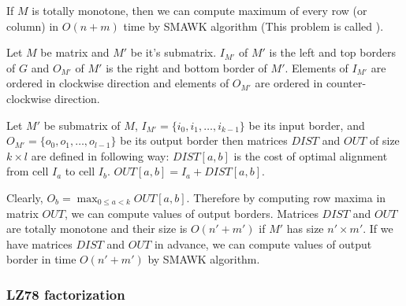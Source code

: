 If $M$ is totally monotone, then we can compute maximum of every row (or column)
in $O(n+m)$ time by SMAWK algorithm \cite{Aggarwal1987} (This problem is called
).

\begin{definition}\cite{Crochemore2002}
Let $M$ be matrix and $M'$ be it's
submatrix.  $I_{M'}$ of $M'$ is the left and top
borders of $G$ and  $O_{M'}$ of $M'$ is the right and
bottom border of $M'$. Elements of $I_{M'}$ are ordered in clockwise direction
and elements of $O_{M'}$ are ordered in counter-clockwise direction.
\end{definition}

\begin{definition}\cite{Crochemore2002}
Let $M'$ be submatrix of $M$, $I_{M'}=\{i_0,i_1,\dots,i_{k-1}\}$ be its input
border, and $O_{M'}=\{o_0,o_1,\dots,o_{l-1}\}$ be its output border then
matrices
$DIST$ and $OUT$ of size $k\times l$ are defined in following way:
$DIST[a,b]$ is the cost of optimal alignment from cell $I_a$ to cell $I_b$.
$OUT[a,b]=I_a+DIST[a,b]$.
\end{definition}

Clearly, $O_b=\max_{0\leq a < k}OUT[a,b]$. Therefore by computing row maxima in
matrix $OUT$, we can compute values of output borders. Matrices $DIST$ and $OUT$
are totally monotone \cite{Crochemore2002} and their size is $O(n'+m')$ if $M'$ has size
$n'\times m'$. If we have matrices $DIST$ and $OUT$ in advance, we can compute
values of output border in time $O(n'+m')$ by SMAWK algorithm.


\subsubsection{LZ78 factorization}

